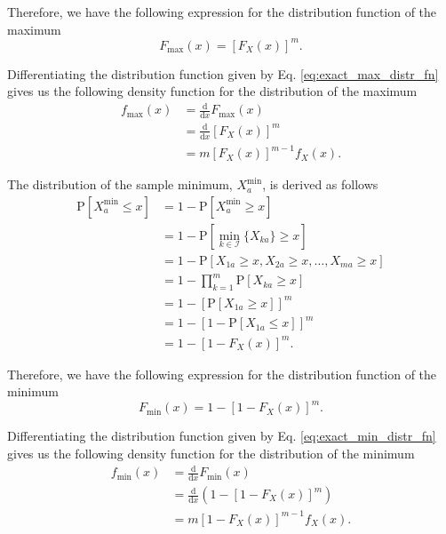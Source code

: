 \documentclass[10pt,letterpaper]{article}\usepackage[]{graphicx}\usepackage[]{color}
\begin{document}
Therefore, we have the following expression for the distribution function of the maximum
%
\begin{equation}\label{eq:exact_max_distr_fn}
F_\text{max}(x) = [F_X(x)]^m.
\end{equation}

Differentiating the distribution function given by Eq. \ref{eq:exact_max_distr_fn} gives us the following density function for the distribution of the maximum
%
\begin{equation}\label{eq:exact_max_dens_fn}
\begin{aligned}
f_\text{max}(x) &= \frac{\text{d}}{\text{d}x} F_\text{max}(x) \\
&= \frac{\text{d}}{\text{d}x} [F_X(x)]^m \\
&= m [F_X(x)]^{m-1} f_X(x).
\end{aligned}
\end{equation}

The distribution of the sample minimum, $X^\text{min}_a$, is derived as follows
%
\begin{equation}\label{eq:exact_min}
\begin{aligned}
\text{P}[X^\text{min}_a \leq x] &= 1 - \text{P}[X^\text{min}_a \geq x] \\
&= 1 - \text{P}\left[\min_{k \in \mathcal{I}}\{X_{ka}\} \geq x\right] \\
&= 1 - \text{P}[X_{1a} \geq x, X_{2a} \geq x, \dots, X_{ma} \geq x] \\
&= 1 - \prod_{k=1}^{m}\text{P}[X_{ka} \geq x] \\
&= 1 - \left[\text{P}[X_{1a} \geq x]\right]^m \\
&= 1 - \left[1 - \text{P}[X_{1a} \leq x]\right]^m \\
&= 1 - \left[1 - F_X(x)\right]^m.
\end{aligned}
\end{equation}

Therefore, we have the following expression for the distribution function of the minimum
%
\begin{equation}\label{eq:exact_min_distr_fn}
F_\text{min}(x) = 1 - [1 - F_X(x)]^m.
\end{equation}

Differentiating the distribution function given by Eq. \ref{eq:exact_min_distr_fn} gives us the following density function for the distribution of the minimum
%
\begin{equation}\label{eq:exact_min_dens_fn}
\begin{aligned}
f_\text{min}(x) &= \frac{\text{d}}{\text{d}x} F_\text{min}(x) \\
&= \frac{\text{d}}{\text{d}x} \left(1 - [1 - F_X(x)]^m\right) \\
&= m\left[1 - F_X(x)\right]^{m-1}f_X(x).
\end{aligned}
\end{equation}
\end{document}
